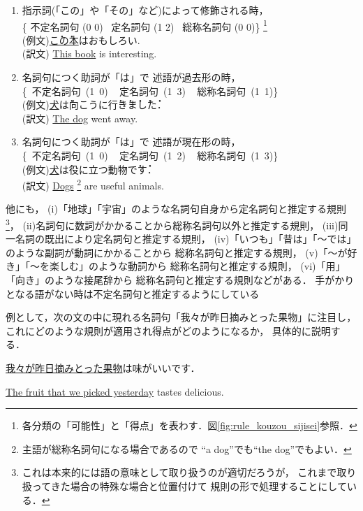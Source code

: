 \begin{enumerate}
\item 指示詞(「この」や「その」など)によって修飾される時，\\
\{
\mbox{不定名詞句}  (0 0) \,
\mbox{定名詞句}   (1 2)  \,
\mbox{総称名詞句}  (0 0)\}
\footnote{
各分類の「可能性」と「得点」を表わす．図\ref{fig:rule_kouzou_sijisei}参照．
}\\
(例文)\underline{\.こ\.の本}はおもしろい. \\
(訳文) \underline{This book} is interesting.
\item 名詞句につく助詞が「は」で
      述語が過去形の時，\\
\mbox{\{
\mbox{不定名詞句} (1 0) \,
\mbox{定名詞句}   (1 3) \,
\mbox{総称名詞句} (1 1)\}}\\
(例文)\underline{犬}\.は向こうに\.行\.き\.ま\.し\.た．\\
(訳文) \underline{The dog} went away.
\item 名詞句につく助詞が「は」で
      述語が現在形の時，\\
\mbox{\{
\mbox{不定名詞句} (1 0) \,
\mbox{定名詞句}   (1 2) \,
\mbox{総称名詞句} (1 3)\}}\\
(例文)\underline{犬}\.は役に立つ動物\.で\.す．\\
(訳文) \underline{Dogs}
\footnote{
主語が総称名詞句になる場合であるので
``a dog''でも``the dog''でもよい．
}
 are useful animals.
\end{enumerate}

他にも，
(i)「地球」「宇宙」のような名詞句自身から定名詞句と推定する規則
\footnote{
\label{foot:tikyuu}
これは本来的には語の意味として取り扱うのが適切だろうが，
    これまで取り扱ってきた場合の特殊な場合と位置付けて
    規則の形で処理することにしている．
}，
(ii)名詞句に数詞がかかることから総称名詞句以外と推定する規則，
(iii)同一名詞の既出により定名詞句と推定する規則，
(iv)「いつも」「昔は」「〜では」のような副詞が動詞にかかることから
総称名詞句と推定する規則，
(v)「〜が好き」「〜を楽しむ」のような動詞から
総称名詞句と推定する規則，
(vi)「用」「向き」のような接尾辞から
総称名詞句と推定する規則などがある．
手がかりとなる語がない時は不定名詞句と推定するようにしている

例として，次の文の中に現れる名詞句「我々が昨日摘みとった果物」に注目し，
これにどのような規則が適用され得点がどのようになるか，
具体的に説明する．

\begin{description}
\item \underline{我々が昨日摘みとった果物}は味がいいです．
\end{description}
\underline{The fruit that we picked yesterday} tastes delicious.\\

